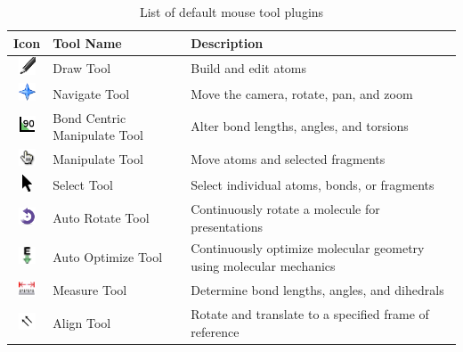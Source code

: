 \documentclass[10pt]{bmc_article}
\newenvironment{bmcformat}{\begin{raggedright}
\baselineskip20pt\sloppy\setboolean{publ}{false}}{\end{raggedright}
\baselineskip20pt\sloppy}
\begin{document}
\begin{bmcformat}
\begin{table}
\caption{List of default mouse tool plugins}
\label{tool-table}
\begin{tabular}{c | l | l }
\hline
Icon & Tool Name & Description \\
\hline
\includegraphics[height=0.2in]{images/draw} & Draw Tool & Build and edit
atoms\\
\includegraphics[height=0.2in]{images/navigate} & Navigate Tool & Move the
camera, rotate, pan, and zoom \\
\includegraphics[height=0.2in]{images/bondcentric} & Bond Centric
Manipulate Tool & Alter bond lengths, angles, and torsions \\
\includegraphics[height=0.2in]{images/manipulate} & Manipulate Tool & Move
atoms and selected fragments \\
\includegraphics[height=0.2in]{images/select} & Select Tool & Select
individual atoms, bonds, or fragments \\
\includegraphics[height=0.2in]{images/autorotate} & Auto Rotate Tool &
Continuously rotate a molecule for presentations \\
\includegraphics[height=0.2in]{images/autoopttool} & Auto Optimize
Tool &
Continuously optimize molecular geometry using molecular mechanics \\
\includegraphics[height=0.2in]{images/measure} & Measure Tool & Determine
bond lengths, angles, and dihedrals \\
\includegraphics[height=0.2in]{images/align} & Align Tool & Rotate and
translate to a specified frame of reference \\
\hline
\end{tabular}
\end{table}


\end{bmcformat}
\end{document}
